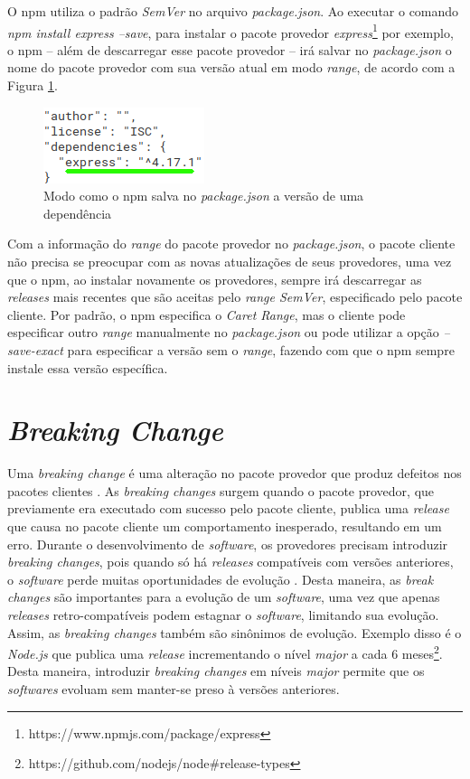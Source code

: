 O \gls{npm} utiliza o padrão \textit{SemVer} no arquivo \textit{package.json}. Ao executar o comando \textit{npm install express --save}, para instalar o pacote provedor \textit{express}\footnote{https://www.npmjs.com/package/express} por exemplo, o \gls{npm} -- além de descarregar esse pacote provedor -- irá salvar no \textit{package.json} o nome do pacote provedor com sua versão atual em modo \textit{range}, de acordo com a Figura \ref{fig:dep_express}.

\begin{figure}
    \centering
    \includegraphics{figuras/dependencies_express.png}
    \caption{Modo como o \gls{npm} salva no \textit{package.json} a versão de uma dependência}
    \label{fig:dep_express}
\end{figure}{}

Com a informação do \textit{range} do pacote provedor no \textit{package.json}, o pacote cliente não precisa se preocupar com as novas atualizações de seus provedores, uma vez que o \gls{npm}, ao instalar novamente os provedores, sempre irá descarregar as \textit{releases} mais recentes que são aceitas pelo \textit{range SemVer}, especificado pelo pacote cliente. Por padrão, o \gls{npm} especifica o \textit{Caret Range}, mas o cliente pode especificar outro \textit{range} manualmente no \textit{package.json} ou pode utilizar a opção \textit{--save-exact} para especificar a versão sem o \textit{range}, fazendo com que o \gls{npm} sempre instale essa versão específica.

\section{\textit{Breaking Change}}
\label{ref-teo:breaking_change}
Uma \textit{breaking change} é uma alteração no pacote provedor que produz defeitos nos pacotes clientes \cite{teorical_reference:semver}. As \textit{breaking changes} surgem quando o pacote provedor, que previamente era executado com sucesso pelo pacote cliente, publica uma \textit{release} que causa no pacote cliente um comportamento inesperado, resultando em um erro. Durante o desenvolvimento de \textit{software}, os provedores precisam introduzir \textit{breaking changes}, pois quando só há \textit{releases} compatíveis com versões anteriores, o \textit{software} perde muitas oportunidades de evolução \cite{teorical_reference:bc_2}. Desta maneira, as \textit{break changes} são importantes para a evolução de um \textit{software}, uma vez que apenas \textit{releases} retro-compatíveis podem estagnar o \textit{software}, limitando sua evolução. Assim, as \textit{breaking changes} também são sinônimos de evolução. Exemplo disso é o \textit{Node.js} que publica uma \textit{release} incrementando o nível \textit{major} a cada 6 meses\footnote{https://github.com/nodejs/node\#release-types}. Desta maneira, introduzir \textit{breaking changes} em níveis \textit{major} permite que os \textit{softwares} evoluam sem manter-se preso à versões anteriores.

